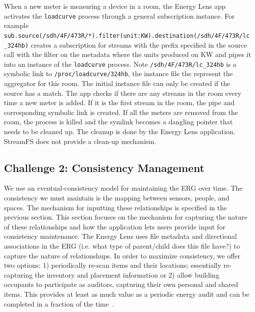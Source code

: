When a new meter is measuring a device in a room, the Energy Lens app activates the \texttt{loadcurve} process through a general
subscription instance.  For example\\ \texttt{sub.source(/sdh/4F/473R/*).filter(unit:KW).destination(/sdh/4F/473R/lc\_324hb)}
creates a subscription for streams with the prefix specified in the source call with the filter on the metadata where 
the units produced on KW and pipes it into an instance of the \texttt{loadcurve} process.  Note \texttt{/sdh/4F/473R/lc\_324hb}
is a symbolic link to \texttt{/proc/loadcurve/324hb}, the instance file the represent the aggregator for this room.
The initial instance file can only be created if the source has a match.  The app checks if there are any streams in the room
every time a new meter is added.  If it is the first stream in the room, the pipe and corresponding symbolic link is created. 
If all the meters are removed from the room, the process is killed and the symlink becomes a dangling pointer that needs to
be cleaned up.  The cleanup is done by the Energy Lens application.  StreamFS does not provide a clean-up mechanism.



\subsection{Challenge 2: Consistency Management}
We use an eventual-consistency model for maintaining the ERG over time.  The consistency we must maintain is the mapping between
sensors, people, and spaces.  The mechanism for inputting these relationships is specified in the previous section.  This section
focuses on the mechanism for capturing the nature of these relationships and how the application lets users provide input for consistency
maintenance.  The Energy Lens uses file metadata
and directional associations in the ERG (i.e. what type of parent/child does this file have?) to capture the nature of relationshups.
In order to maximize consistency, we offer two options: 1) periodically
re-scan items and their locations; essentially re-capturing the inventory and placement information or
2) allow building occupants to participate as auditors, capturing their own personal and shared items.
This provides at least as much value as a periodic energy audit and can be completed in a fraction of the 
time~\cite{aceee_mobileaudit}.

